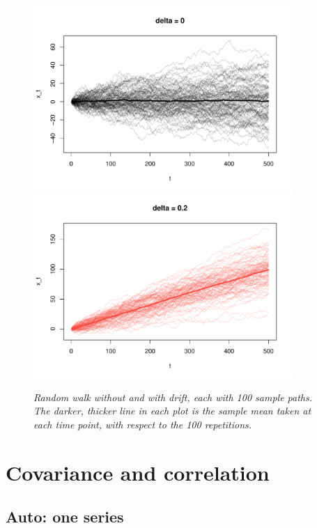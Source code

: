 \documentclass{article}
\begin{document}
\begin{figure}[p]
\centering
\includegraphics[width=0.875\textwidth]{fig/rw-1.pdf}
\includegraphics[width=0.875\textwidth]{fig/rw-2.pdf}
\caption{\it Random walk without and with drift, each with 100 sample paths. The
  darker, thicker line in each plot is the sample mean taken at each time point,
  with respect to the 100 repetitions.}
\label{fig:rw}
\end{figure}

\section{Covariance and correlation}

\subsection{Auto: one series}
\end{document}
